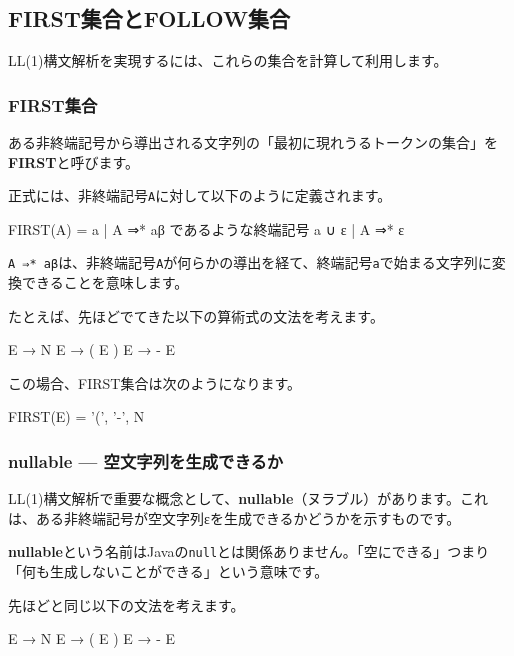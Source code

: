 \subsection{FIRST集合とFOLLOW集合}

LL(1)構文解析を実現するには、これらの集合を計算して利用します。

\subsubsection{FIRST集合}

ある非終端記号から導出される文字列の「最初に現れうるトークンの集合」を\textbf{\sffamily FIRST}と呼びます。

正式には、非終端記号\texttt{A}に対して以下のように定義されます。

\begin{codescreen}{}
FIRST(A) = { a | A ⇒* aβ であるような終端記号 a } ∪ { ε | A ⇒* ε }
\end{codescreen}

\texttt{A\ ⇒*\ aβ}は、非終端記号\texttt{A}が何らかの導出を経て、終端記号\texttt{a}で始まる文字列に変換できることを意味します。

たとえば、先ほどでてきた以下の算術式の文法を考えます。

\begin{codescreen}{}
E  → N
E  → ( E )
E  → - E
\end{codescreen}

この場合、FIRST集合は次のようになります。

\begin{codescreen}{}
FIRST(E) = { '(', '-', N }
\end{codescreen}

\subsubsection{nullable --- 空文字列を生成できるか}

LL(1)構文解析で重要な概念として、\textbf{\sffamily nullable}（ヌラブル）があります。これは、ある非終端記号が空文字列εを生成できるかどうかを示すものです。

\textbf{\sffamily nullable}という名前はJavaの\texttt{null}とは関係ありません。「空にできる」つまり「何も生成しないことができる」という意味です。

先ほどと同じ以下の文法を考えます。

\begin{codescreen}{}
E  → N
E  → ( E )
E  → - E
\end{codescreen}

